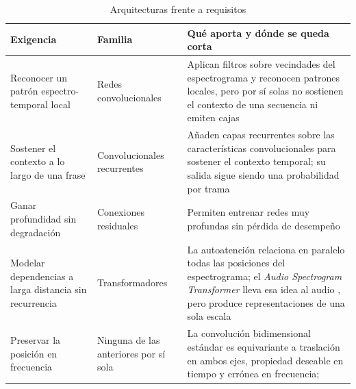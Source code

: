 \begin{table}[htbp]
    \centering
    \caption{Arquitecturas frente a requisitos}
    \label{tab:familias}
    \small
    \begin{tabular}{@{}L{4.0cm}L{3.4cm}L{7.2cm}@{}}
        \toprule
        \textbf{Exigencia}                                     & \textbf{Familia} & \textbf{Qué aporta y dónde se queda corta} \\
        \midrule
        Reconocer un patrón espectro-temporal local            &
        Redes convolucionales                                  &
        Aplican filtros sobre vecindades del espectrograma y reconocen patrones
        locales, pero por sí solas no sostienen el contexto de una secuencia ni
        emiten cajas                                                                                                           \\
        \addlinespace
        Sostener el contexto a lo largo de una frase           &
        Convolucionales recurrentes                            &
        Añaden capas recurrentes sobre las características convolucionales para
        sostener el contexto temporal; su salida sigue siendo una probabilidad por
        trama                                                                                                                  \\
        \addlinespace
        Ganar profundidad sin degradación                      &
        Conexiones residuales                                  &
        Permiten entrenar redes muy profundas sin pérdida de desempeño
        \citep{he_deep_2016}                                                                                                   \\
        \addlinespace
        Modelar dependencias a larga distancia sin recurrencia &
        Transformadores                                        &
        La autoatención relaciona en paralelo todas las posiciones del
        espectrograma; el \textit{Audio Spectrogram Transformer} lleva esa idea al
        audio \citep{gong_ast_2021}, pero produce representaciones de una sola
        escala \citep{zhu_sound_2025}                                                                                                 \\
        \addlinespace
        Preservar la posición en frecuencia                    &
        Ninguna de las anteriores por sí sola                  &
        La convolución bidimensional estándar es equivariante a traslación en
        ambos ejes, propiedad deseable en tiempo y errónea en frecuencia;

\end{tabular}
\end{table}

